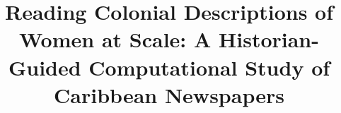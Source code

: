 \documentclass[sigconf]{acmart}
\begin{document}
\title{Reading Colonial Descriptions of Women at Scale: A Historian-Guided Computational Study of Caribbean Newspapers}









\renewcommand{\shortauthors}{Trovato et al.}
\end{document}
